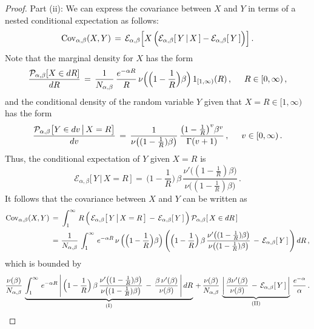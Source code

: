 \documentclass[10pt]{article}
\numberwithin{equation}{section}
\theoremstyle{definition}
\begin{document}
\begin{proof}
\noindent Part (ii): We can express the covariance between $X$ and $Y$ in terms of a nested conditional expectation as follows:
\begin{align*}
\textup{Cov}_{\alpha,\beta}(X,Y)\,=\, \mathcal{E}_{\alpha,\beta}\Big[ X \,\Big(\mathcal{E}_{\alpha,\beta}[\,Y \,|\, X\,]-\mathcal{E}_{\alpha,\beta}[\,Y\, ]  \Big)  \Big]  \,.
\end{align*}
Note that the marginal density for $X$ has the form
\begin{align*}
\frac{\mathcal{P}_{\alpha,\beta}[ X\in dR] }{dR}\,=\, \frac{1}{N_{\alpha,\beta} } \,\frac{ e^{-\alpha R  } }{ R } \,\nu\Big( \Big(1-\frac{1}{R}\Big)  \beta\Big)\,1_{ [1,\infty) }(R)  \,,\hspace{.5cm} R\in [0,\infty)\,,
\end{align*}
and  the conditional density of the random variable $Y$ given that $X=R\in [1,\infty)$ has the form
\begin{align*}
\frac{\mathcal{P}_{\alpha,\beta}\big[ Y\in dv\,\big| \, X=R  \big] }{dv}\,=\,\frac{1}{ \nu\big((1-\frac{1}{R})  \beta  \big) }\,\frac{ \big(1-\frac{1}{R} 
  \big)^v \beta^v }{ \Gamma(v+1)  }\,,\hspace{.5cm} v\in [0,\infty)\,.
\end{align*}
Thus, the conditional expectation of $Y$ given $X=R$ is 
$$
\mathcal{E}_{\alpha,\beta}\big[\,Y\, \big|\, X=R\,\big]\,=\, \Big(1-\frac{1}{R}\Big)\,\beta\,\frac{  \nu'\big((1-\frac{1}{R})   \beta\big)   }{ \nu\big((1-\frac{1}{R}) \beta  \big)   } \,. $$  It follows that the covariance between $X$ and $Y$ can be written as
\begin{align*}
    \textup{Cov}_{\alpha,\beta}(X,Y)\,= \,&\,\int_1^{\infty}\,R\,\Big(\,\mathcal{E}_{\alpha,\beta}\big[\,Y\, \big|\, X=R\,\big]\,-\, \mathcal{E}_{\alpha,\beta}[\,Y\, ]  \,\Big)\,\mathcal{P}_{\alpha,\beta}[\, X\in dR\,]
    \\ \,= \,&\,\frac{1}{N_{\alpha,\beta} }\,\int^{\infty}_1 \,e^{-\alpha R} \,\nu\,\Big(\Big(1-\frac{1}{R}\Big)\beta  \Big) \, \Bigg(\Big(1-\frac{1}{R}\Big)\, \beta\,\frac{  \nu'\big((1-\frac{1}{R}) \beta  \big)   }{ \nu\big((1-\frac{1}{R})  \beta \big)   } \,-\,\mathcal{E}_{\alpha,\beta}[\,Y\, ]  \,\Bigg)\,dR  \,, \nonumber  
\end{align*}
which is bounded by
\begin{align}\label{Tizlep}
\frac{\nu( \beta) }{N_{\alpha,\beta} }\,\underbrace{\int_1^{\infty}\, e^{-\alpha R}  \, \Bigg|\,\Big(1-\frac{1}{R}\Big)\,\beta\,\frac{  \nu'\big((1-\frac{1}{R}) \beta  \big)   }{ \nu\big((1-\frac{1}{R}) \beta  \big)   } \,-\,\frac{\beta\, \nu'(\beta)   }{ \nu(\beta) } \,\Bigg| \,dR}_{\textup{(I)}} \,+\,\frac{\nu( \beta) }{N_{\alpha,\beta} }\, \underbrace{\bigg| \, \frac{\beta \nu'(\beta)   }{ \nu(\beta) }\,-\,\mathcal{E}_{\alpha,\beta}[\,Y\, ] \,\bigg|}_{\textup{(II)} }\,\frac{e^{-\alpha}}{\alpha} \,.

\end{align}
\end{proof}
\end{document}
